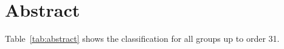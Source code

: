 \section{Abstract}
Table~\ref{tab:abstract} shows the classification for all groups up to order 31.

\begin{table}
    \caption{Classification of Groups up to Order 31}\label{tab:abstract}
    \begin{center}

\end{center}
\end{table}
